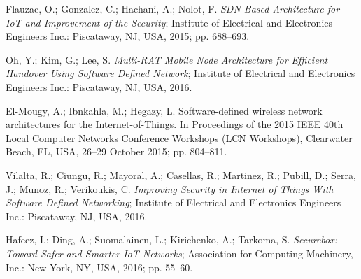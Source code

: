 \documentclass[symmetry,article,accept,moreauthors,pdftex10pt,a4paper]{mdpi}
\begin{document}
\begin{thebibliography}{999}
Flauzac, O.; Gonzalez, C.; Hachani, A.; Nolot, F.
\newblock \emph{SDN Based Architecture for IoT and Improvement of the Security};
\newblock Institute of Electrical and Electronics Engineers Inc.: Piscataway, NJ, USA, 2015; pp.
688--693.

Oh, Y.; Kim, G.; Lee, S.
\newblock \emph{Multi-RAT Mobile Node Architecture for Efficient Handover Using
	Software Defined Network};
\newblock Institute of Electrical and Electronics Engineers Inc.: Piscataway, NJ, USA, 2016.

El-Mougy, A.; Ibnkahla, M.; Hegazy, L.
\newblock Software-defined wireless network architectures for the
Internet-of-Things.
\newblock In Proceedings of the 2015 IEEE 40th Local Computer Networks Conference Workshops (LCN
Workshops), Clearwater Beach, FL, USA, 26--29 October 2015; pp. 804--811.


Vilalta, R.; Ciungu, R.; Mayoral, A.; Casellas, R.; Martinez, R.; Pubill, D.;
Serra, J.; Munoz, R.; Verikoukis, C.
\newblock\emph{ Improving Security in Internet of Things With Software Defined
	Networking};
\newblock Institute of Electrical and Electronics Engineers Inc.: Piscataway, NJ, USA, 2016.

Hafeez, I.; Ding, A.; Suomalainen, L.; Kirichenko, A.; Tarkoma, S.
\newblock \emph{Securebox: Toward Safer and Smarter IoT Networks};
\newblock Association for Computing Machinery, Inc.: New York, NY, USA, 2016; pp. 55--60.


\end{thebibliography}


\end{document}

